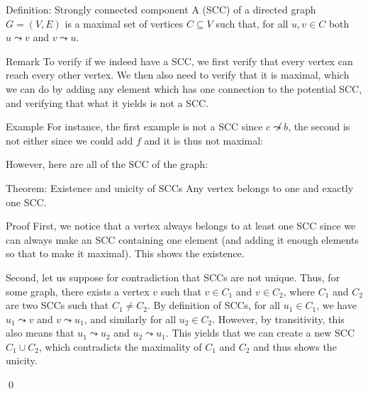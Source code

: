 \documentclass[a4paper]{article}
\begin{document}
\begin{parag}{Definition: Strongly connected component}
    A  (SCC) of a directed graph $G = \left(V, E\right)$ is a maximal set of vertices $C \subseteq V$ such that, for all $u, v \in C$ both $u \leadsto v$ and $v \leadsto u$. 

    \begin{subparag}{Remark}
        To verify if we indeed have a SCC, we first verify that every vertex can reach every other vertex. We then also need to verify that it is maximal, which we can do by adding any element which has one connection to the potential SCC, and verifying that what it yields is not a SCC.
    \end{subparag}

    \begin{subparag}{Example}
        For instance, the first example is not a SCC since $c\not\leadsto b$, the second is not either since we could add $f$ and it is thus not maximal:

        However, here are all of the SCC of the graph:
    \end{subparag}
\end{parag}

\begin{parag}{Theorem: Existence and unicity of SCCs}
    Any vertex belongs to one and exactly one SCC.

    \begin{subparag}{Proof}
        First, we notice that a vertex always belongs to at least one SCC since we can always make an SCC containing one element (and adding it enough elements so that to make it maximal). This shows the existence.

        Second, let us suppose for contradiction that SCCs are not unique. Thus, for some graph, there exists a vertex $v$ such that $v \in C_1$ and $v \in C_2$, where $C_1$ and $C_2$ are two SCCs such that $C_1 \neq C_2$. By definition of SCCs, for all $u_1 \in C_1$, we have $u_1 \leadsto v$ and $v \leadsto u_1$, and similarly for all $u_2 \in C_2$. However, by transitivity, this also means that $u_1 \leadsto u_2$ and $u_2 \leadsto u_1$. This yields that we can create a new SCC $C_1 \cup C_2$, which contradicts the maximality of $C_1$ and $C_2$ and thus shows the unicity.

        \qed
    \end{subparag}
\end{parag}
\end{document}
